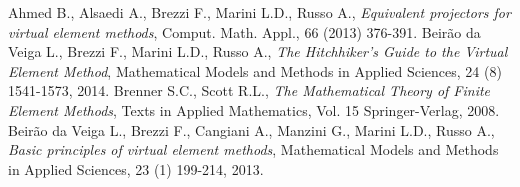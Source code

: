 \begin{thebibliography}{99}
 Ahmed B., Alsaedi A., Brezzi F., Marini L.D., Russo A., \textit{Equivalent projectors for virtual element methods}, Comput. Math. Appl., 66 (2013) 376-391.
 Beirão da Veiga L., Brezzi F., Marini L.D., Russo A., \textit{The Hitchhiker's Guide to the Virtual Element Method}, Mathematical Models and Methods in Applied Sciences, 24 (8) 1541-1573, 2014.
 Brenner S.C., Scott R.L., \textit{The Mathematical Theory of Finite Element Methods}, Texts in Applied Mathematics, Vol. 15 Springer-Verlag, 2008.
 Beirão da Veiga L., Brezzi F., Cangiani A., Manzini G., Marini L.D., Russo A., \textit{Basic principles of virtual element methods}, Mathematical Models and Methods in Applied Sciences, 23 (1) 199-214, 2013.
\end{thebibliography}
